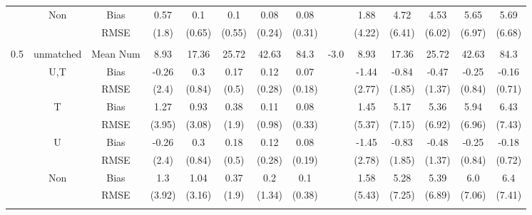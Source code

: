 \begin{tabular}{@{\extracolsep{5pt}}lc|cccccc|lccccc}
 & Non & Bias & 0.57 & 0.1 & 0.1 & 0.08 & 0.08 &  & 1.88 & 4.72 & 4.53 & 5.65 & 5.69 \\
 &  & RMSE & (1.8) & (0.65) & (0.55) & (0.24) & (0.31) &  & (4.22) & (6.41) & (6.02) & (6.97) & (6.68) \\
 &  &  &  &  &  &  &  &  &  &  &  &  &  \\
0.5 & unmatched & Mean Num & 8.93 & 17.36 & 25.72 & 42.63 & 84.3 & -3.0 & 8.93 & 17.36 & 25.72 & 42.63 & 84.3 \\
 & U,T & Bias & -0.26 & 0.3 & 0.17 & 0.12 & 0.07 &  & -1.44 & -0.84 & -0.47 & -0.25 & -0.16 \\
 &  & RMSE & (2.4) & (0.84) & (0.5) & (0.28) & (0.18) &  & (2.77) & (1.85) & (1.37) & (0.84) & (0.71) \\
 & T & Bias & 1.27 & 0.93 & 0.38 & 0.11 & 0.08 &  & 1.45 & 5.17 & 5.36 & 5.94 & 6.43 \\
 &  & RMSE & (3.95) & (3.08) & (1.9) & (0.98) & (0.33) &  & (5.37) & (7.15) & (6.92) & (6.96) & (7.43) \\
 & U & Bias & -0.26 & 0.3 & 0.18 & 0.12 & 0.08 &  & -1.45 & -0.83 & -0.48 & -0.25 & -0.18 \\
 &  & RMSE & (2.4) & (0.84) & (0.5) & (0.28) & (0.19) &  & (2.78) & (1.85) & (1.37) & (0.84) & (0.72) \\
 & Non & Bias & 1.3 & 1.04 & 0.37 & 0.2 & 0.1 &  & 1.58 & 5.28 & 5.39 & 6.0 & 6.4 \\
 &  & RMSE & (3.92) & (3.16) & (1.9) & (1.34) & (0.38) &  & (5.43) & (7.25) & (6.89) & (7.06) & (7.41) \\
 &  &  &  &  &  &  &  &  &  &  &  &  &  \\
\hline 
\bottomrule 
\end{tabular}
